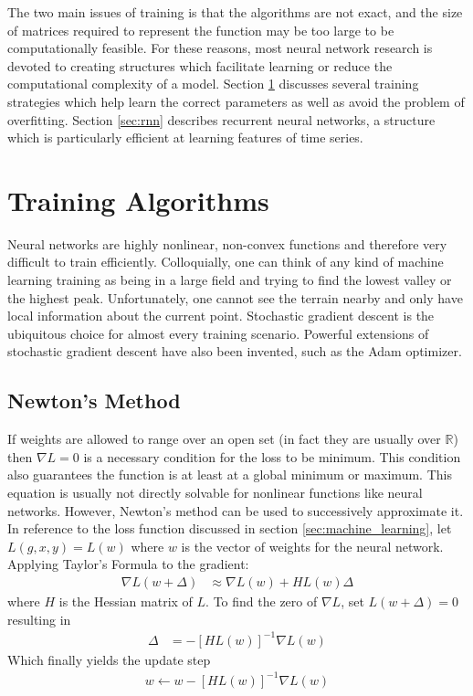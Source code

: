 The two main issues of training is that the algorithms are not exact, and the size of matrices required to represent the function may be too large to be computationally feasible. For these reasons, most neural network research is devoted to creating structures which facilitate learning or reduce the computational complexity of a model.  Section \ref{sec:training} discusses several training strategies which help learn the correct parameters as well as avoid the problem of overfitting.  Section \ref{sec:rnn} describes recurrent neural networks, a structure which is particularly efficient at learning features of time series.  

\section{Training Algorithms}\label{sec:training}
Neural networks are highly nonlinear, non-convex functions and therefore very difficult to train efficiently.  Colloquially, one can think of any kind of machine learning training as being in a large field and trying to find the lowest valley or the highest peak.  Unfortunately, one cannot see the terrain nearby and only have local information about the current point.  Stochastic gradient descent is the ubiquitous choice for almost every training scenario.  Powerful extensions of stochastic gradient descent have also been invented, such as the Adam optimizer.

\subsection{Newton's Method}
If weights are allowed to range over an open set (in fact they are usually over $\mathbb{R}$) then $\nabla L = 0$ is a necessary condition for the loss to be minimum.  This condition also guarantees the function is at least at a global minimum or maximum.  This equation is usually not directly solvable for nonlinear functions like neural networks.  However, Newton's method can be used to successively approximate it.  In reference to the loss function discussed in section \ref{sec:machine_learning}, let $L(g,x,y) = L(w)$ where $w$ is the vector of weights for the neural network.  Applying Taylor's Formula to the gradient:
\begin{align}
\nabla L(w+\Delta) &\approx \nabla L(w) + HL(w)\Delta
\end{align}
where $H$ is the Hessian matrix of $L$. 
To find the zero of $\nabla L$, set $L(w+\Delta) = 0$ resulting in  
\begin{align}\label{eq:newton}
\Delta &= -[HL(w)]^{-1}\nabla L(w)
\end{align}
Which finally yields the update step
\begin{align}\label{eq:newtons}
w \gets w - [HL(w)]^{-1}\nabla L(w)
\end{align}

